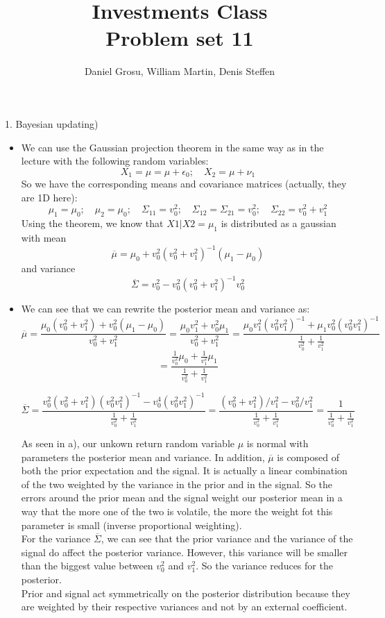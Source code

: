 \documentclass[10pt]{article}
\newenvironment{exercise}[2][Exercise]{\begin{trivlist}
  \item[\hskip \labelsep {\bfseries #1}\hskip \labelsep {\bfseries #2.}]}{\end{trivlist}}
\begin{document}
  \pagecolor{solar}
	
  \renewcommand{\qedsymbol}{\smiley}
	\title{Investments Class \\ Problem set 11}
	\author{Daniel Grosu, William Martin, Denis Steffen}
		
\maketitle

\begin{exercise}(1. Bayesian updating)
\begin{itemize}
	\item[a)] We can use the Gaussian projection theorem in the same way as in the lecture with the following random variables: 
	$$ X_1 = \mu = \mu + \epsilon_0 ; \quad X_2 = \mu + \nu_1$$ So we have the corresponding means and covariance matrices (actually, they are 1D here): 
	$$ \mu_1 = \mu_0 ; \quad \mu_2 = \mu_0 ; \quad \Sigma_{11} = v_0^2; \quad \Sigma_{12} = \Sigma_{21} = v_0^2; \quad \Sigma_{22} = v_0^2 + v_1^2$$ Using the theorem, we know that $X1|X2 = \mu_1$ is distributed as a gaussian with mean $$ \overline{\mu} = \mu_0 + v_0^2(v_0^2 + v_1^2)^{-1}(\mu_1 - \mu_0)$$ and variance $$ \overline{\Sigma} = v_0^2 - v_0^2(v_0^2 + v_1^2)^{-1}v_0^2$$
	\item[b)] We can see that we can rewrite the posterior mean and variance as:
	$$ \overline{\mu} = \frac{\mu_0(v_0^2  + v_1^2) + v_0^2(\mu_1-\mu_0)}{v_0^2  + v_1^2} = \frac{\mu_0v_1^2 + v_0^2\mu_1}{v_0^2  + v_1^2} = \frac{\mu_0v_1^2(v_0^2v_1^2)^{-1} + \mu_1v_0^2(v_0^2v_1^2)^{-1}}{\frac{1}{v_0^2}  + \frac{1}{v_1^2}} $$ $$= \frac{\frac{1}{v_0^2}\mu_0 + \frac{1}{v_1^2}\mu_1}{\frac{1}{v_0^2}  + \frac{1}{v_1^2}} $$ 

	$$ \overline{\Sigma} = \frac{v_0^2(v_0^2 + v_1^2)(v_0^2v_1^2)^{-1} - v_0^4(v_0^2v_1^2)^{-1}}{\frac{1}{v_0^2}  + \frac{1}{v_1^2}} = \frac{(v_0^2 + v_1^2)/v_1^2 - v_0^2/v_1^2}{\frac{1}{v_0^2}  + \frac{1}{v_1^2}} = \frac{1}{\frac{1}{v_0^2}  + \frac{1}{v_1^2}}$$

	As seen in a), our unkown return random variable $\mu$ is normal with parameters the posterior mean and variance. In addition, $\overline{\mu}$ is composed of both the prior expectation and the signal. It is actually a linear combination of the two weighted by the variance in the prior and in the signal. So the errors around the prior mean and the signal weight our posterior mean in a way that the more one of the two is volatile, the more the weight fot this parameter is small (inverse proportional weighting). \\
	For the variance $\overline{\Sigma}$, we can see that the prior variance and the variance of the signal do affect the posterior variance. However, this variance will be smaller than the biggest value between $v_0^2$ and $v_1^2$. So the variance reduces for the posterior. \\
	Prior and signal act symmetrically on the posterior distribution because they are weighted by their respective variances and not by an external coefficient. 


\end{itemize}
\end{exercise}
\end{document}
